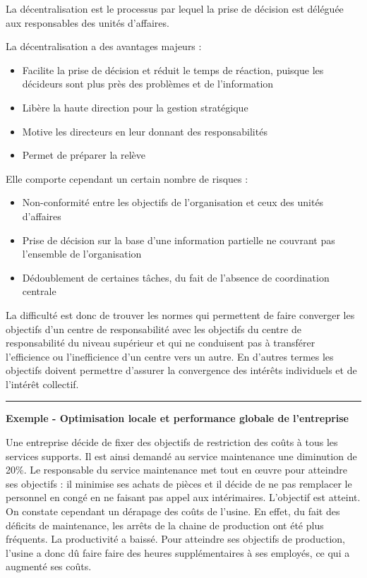 \documentclass[oneside]{kaobook}
\begin{document}
La décentralisation est le processus par lequel la prise de décision est déléguée aux responsables des unités d'affaires.

\begin{kaobox}
La décentralisation a des avantages majeurs :
\begin{itemize}
\item Facilite la prise de décision et réduit le temps de réaction, puisque les décideurs sont plus près des problèmes et de l’information
\item Libère la haute direction pour la gestion stratégique
\item Motive les directeurs en leur donnant des responsabilités
\item Permet de préparer la relève
\end{itemize}
Elle comporte cependant un certain nombre de risques : 
\begin{itemize}
\item Non-conformité entre les objectifs de l’organisation et ceux des unités d’affaires
\item Prise de décision sur la base d’une information partielle ne couvrant pas l'ensemble de l'organisation
\item Dédoublement de certaines tâches, du fait de l'absence de coordination centrale
\end{itemize}
\end{kaobox}

La difficulté est donc de trouver les normes qui permettent de faire converger les objectifs d’un centre de responsabilité avec les objectifs du centre de responsabilité du niveau supérieur et qui ne conduisent pas à transférer l’efficience ou l’inefficience d’un centre vers un autre. En d’autres termes les objectifs doivent permettre d’assurer la convergence des intérêts individuels et de l’intérêt collectif.

\noindent\rule{\textwidth}{0.5pt}
\textbf{Exemple - Optimisation locale et performance globale de l’entreprise}

Une entreprise décide de fixer des objectifs de restriction des coûts à tous les services supports. Il est ainsi demandé au service maintenance une diminution de 20\%. Le responsable du service maintenance met tout en œuvre pour atteindre ses objectifs : il minimise ses achats de pièces et il décide de ne pas remplacer le personnel en congé en ne faisant pas appel aux intérimaires. L’objectif est atteint. On constate cependant un dérapage des coûts de l’usine. En effet, du fait des déficits de maintenance, les arrêts de la chaine de production ont été plus fréquents. La productivité a baissé. Pour atteindre ses objectifs de production, l’usine a donc dû faire faire des heures supplémentaires à ses employés, ce qui a augmenté ses coûts.
\end{document}
